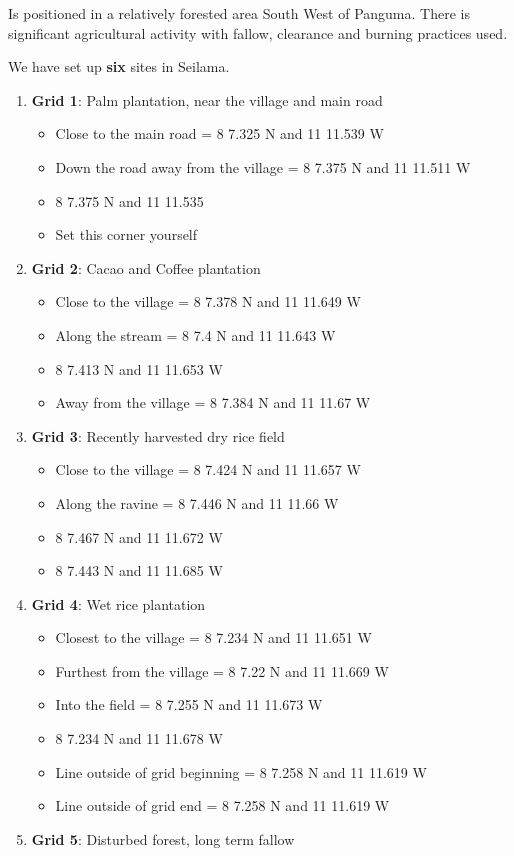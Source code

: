 \documentclass[
]{article}
\providecommand{\tightlist}{%
  \setlength{\itemsep}{0pt}\setlength{\parskip}{0pt}}
\begin{document}
Is positioned in a relatively forested area South West of Panguma. There
is significant agricultural activity with fallow, clearance and burning
practices used.

We have set up \textbf{six} sites in Seilama.

\begin{enumerate}
\def\labelenumi{\arabic{enumi}.}
\tightlist
\item
  \textbf{Grid 1}: Palm plantation, near the village and main road

  \begin{itemize}
  \tightlist
  \item
    Close to the main road = 8 7.325 N and 11 11.539 W
  \item
    Down the road away from the village = 8 7.375 N and 11 11.511 W
  \item
    8 7.375 N and 11 11.535
  \item
    Set this corner yourself
  \end{itemize}
\item
  \textbf{Grid 2}: Cacao and Coffee plantation

  \begin{itemize}
  \tightlist
  \item
    Close to the village = 8 7.378 N and 11 11.649 W
  \item
    Along the stream = 8 7.4 N and 11 11.643 W
  \item
    8 7.413 N and 11 11.653 W
  \item
    Away from the village = 8 7.384 N and 11 11.67 W
  \end{itemize}
\item
  \textbf{Grid 3}: Recently harvested dry rice field

  \begin{itemize}
  \tightlist
  \item
    Close to the village = 8 7.424 N and 11 11.657 W
  \item
    Along the ravine = 8 7.446 N and 11 11.66 W
  \item
    8 7.467 N and 11 11.672 W
  \item
    8 7.443 N and 11 11.685 W
  \end{itemize}
\item
  \textbf{Grid 4}: Wet rice plantation

  \begin{itemize}
  \tightlist
  \item
    Closest to the village = 8 7.234 N and 11 11.651 W
  \item
    Furthest from the village = 8 7.22 N and 11 11.669 W
  \item
    Into the field = 8 7.255 N and 11 11.673 W
  \item
    8 7.234 N and 11 11.678 W
  \item
    Line outside of grid beginning = 8 7.258 N and 11 11.619 W
  \item
    Line outside of grid end = 8 7.258 N and 11 11.619 W
  \end{itemize}
\item
  \textbf{Grid 5}: Disturbed forest, long term fallow


\end{enumerate}
\end{document}

